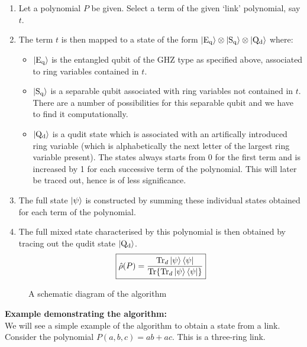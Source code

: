\documentclass{scrartcl}
\begin{document}
\begin{enumerate}
    \item Let a polynomial $P$ be given. Select a term of the given `link' polynomial, say $t$. 
    \item The term $t$ is then mapped to a state of the form $\ket{\mathrm{E_q}}\otimes\ket{\mathrm{S_q}}\otimes\ket{\mathrm{Q_d}}$ where: 
    \begin{itemize}
        \item $\ket{\mathrm{E_q}}$ is the entangled qubit of the GHZ type as specified above, associated to ring variables contained in $t$.
        \item $\ket{\mathrm{S_q}}$ is a separable qubit associated with ring variables not contained in $t$. There are a number of possibilities for this separable qubit and we have to find it computationally.
        \item $\ket{\mathrm{Q_d}}$ is a qudit state which is associated with an artifically introduced ring variable (which is alphabetically the next letter of the largest ring variable present). The states always starts from 0 for the first term and is increased by 1 for each successive term of the polynomial. This will later be traced out, hence is of less significance. 
    \end{itemize}
    \item The full state $\ket{\psi}$ is constructed by summing these individual states obtained for each term of the polynomial. 
    \item The full mixed state characterised by this polynomial is then obtained by tracing out the qudit state $\ket{\mathrm{Q_d}}$.
    $$\boxed{\hat{\rho}(P)=\frac{\Tr_d{\ket{\psi}\bra{\psi}}}{\Tr{\Tr_d{\ket{\psi}\bra{\psi}}}}}$$
\end{enumerate}
\begin{figure}[H]
    \centering 
   \scalebox{0.8}{ }
   \caption{A schematic diagram of the algorithm}
\end{figure}
\textbf{Example demonstrating the algorithm:} \\[0.3cm]
We will see a simple example of the algorithm to obtain a state from a link. Consider the polynomial $P(a,b,c) = ab+ac$. This is a three-ring link. 
\end{document}
